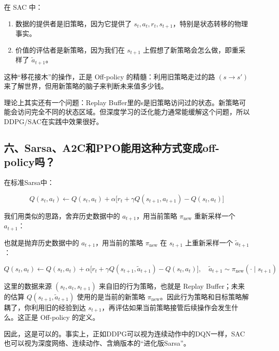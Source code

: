 在 SAC 中：

\begin{enumerate}
\def\labelenumi{\arabic{enumi}.}
\tightlist
\item
  数据的提供者是旧策略，因为它提供了 \(s_t,a_t,r_t,s_{t+1}\)，特别是状态转移的物理事实。
\item
  价值的评估者是新策略，因为我们在 \(s_{t+1}\) 上假想了新策略会怎么做，即重采样了 \(\tilde{a}_{t+1}\)。
\end{enumerate}

这种``移花接木''的操作，正是 Off-policy 的精髓：利用旧策略走过的路 \((s\to s')\) 来了解世界，但用新策略的脑子来判断未来值多少钱。

理论上其实还有一个问题：Replay Buffer里的s是旧策略访问过的状态。新策略可能会访问完全不同的状态区域。但深度学习的泛化能力通常能缓解这个问题，所以DDPG/SAC在实践中效果很好。

\hypertarget{ux516dsarsaa2cux548cppoux80fdux7528ux8fd9ux79cdux65b9ux5f0fux53d8ux6210off-policyux5417}{%
\subsection{六、Sarsa、A2C和PPO能用这种方式变成off-policy吗？}\label{ux516dsarsaa2cux548cppoux80fdux7528ux8fd9ux79cdux65b9ux5f0fux53d8ux6210off-policyux5417}}

在标准Sarsa中：

\[
Q(s_t,a_t)
\leftarrow
Q(s_t,a_t)
+
\alpha
\bigl[
r_t
+
\gamma Q(s_{t+1},a_{t+1})
-
Q(s_t,a_t)
\bigr]
\]

我们用类似的思路，舍弃历史数据中的 \(a_{t+1}\)，用当前策略 \(\pi_{\mathrm{new}}\) 重新采样一个 \(a_{t+1}\)：

也就是抛弃历史数据中的 \(a_{t+1}\)，用当前的策略 \(\pi_{\mathrm{new}}\) 在 \(s_{t+1}\) 上重新采样一个 \(\tilde{a}_{t+1}\)：

\[
Q(s_t,a_t)
\leftarrow
Q(s_t,a_t)
+
\alpha
\bigl[
r_t
+
\gamma Q(s_{t+1},\tilde{a}_{t+1})
-
Q(s_t,a_t)
\bigr],
\quad
\tilde{a}_{t+1}\sim\pi_{\mathrm{new}}(\cdot\mid s_{t+1})
\]

这里的数据来源 \((s_t,a_t,s_{t+1})\) 来自旧的行为策略，也就是 Replay Buffer；未来的估算 \(Q(s_{t+1},\tilde{a}_{t+1})\) 使用的是当前的新策略 \(\pi_{\mathrm{new}}\)。因此行为策略和目标策略解耦了，你利用旧的经验到达 \(s_{t+1}\)，再评估如果当前策略接管后续操作会发生什么。这正是 Off-policy 的定义。

因此，这是可以的。事实上，正如DDPG可以视为连续动作中的DQN一样，SAC也可以视为深度网络、连续动作、含熵版本的``进化版Sarsa''。

